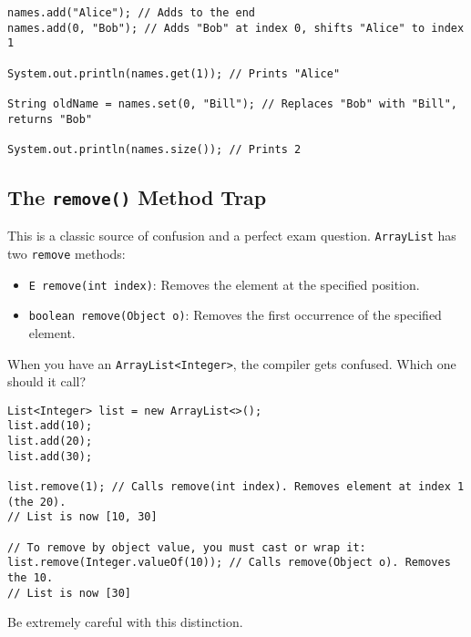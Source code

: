 \documentclass[12pt]{article}
\begin{document}
\begin{enumerate}[label=(\arabic*)]
\begin{verbatim}
names.add("Alice"); // Adds to the end
names.add(0, "Bob"); // Adds "Bob" at index 0, shifts "Alice" to index 1

System.out.println(names.get(1)); // Prints "Alice"

String oldName = names.set(0, "Bill"); // Replaces "Bob" with "Bill", returns "Bob"

System.out.println(names.size()); // Prints 2
\end{verbatim}

\subsection{The \texttt{remove()} Method Trap}
This is a classic source of confusion and a perfect exam question. \texttt{ArrayList} has two \texttt{remove} methods:
\begin{itemize}
    \item \texttt{E remove(int index)}: Removes the element at the specified position.
    \item \texttt{boolean remove(Object o)}: Removes the first occurrence of the specified element.
\end{itemize}
When you have an \texttt{ArrayList<Integer>}, the compiler gets confused. Which one should it call?
\begin{verbatim}
List<Integer> list = new ArrayList<>();
list.add(10);
list.add(20);
list.add(30);

list.remove(1); // Calls remove(int index). Removes element at index 1 (the 20).
// List is now [10, 30]

// To remove by object value, you must cast or wrap it:
list.remove(Integer.valueOf(10)); // Calls remove(Object o). Removes the 10.
// List is now [30]
\end{verbatim}
Be extremely careful with this distinction.


\end{enumerate}
\end{document}
